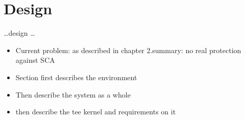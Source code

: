 \chapter{Design}
\label{sec:design}



\ldots design \ldots

\begin{itemize}
    \item Current problem: as described in chapter 2.summary: no real protection against SCA
    \item Section first describes the environment
    \item Then describe the system as a whole
    \item then describe the tee kernel and requirements on it
\end{itemize}

